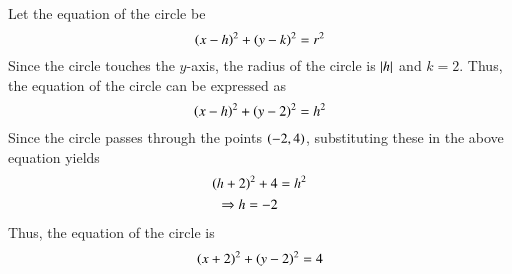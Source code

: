 Let the equation of the circle be
%
\begin{equation}
\left(x-h\right)^2 + \left(y-k\right)^2 = r^2
\end{equation}
%
Since the circle touches the $y$-axis, the radius of the circle is $\left\vert h\right\vert$ and $k = 2$.  Thus, the equation of the circle can be
expressed as
%
\begin{equation}
\left(x-h\right)^2 + \left(y-2\right)^2 = h^2
\end{equation}
%
Since the circle passes through the points  $\left(-2,4\right)$, substituting these in the above equation yields
%
\begin{align}
\left(h+2\right)^2 + 4 &= h^2 \\
\Rightarrow h = -2
\end{align}
%
Thus, the equation of the circle is
%
\begin{equation}
\left(x+2\right)^2 + \left(y-2\right)^2 = 4
\end{equation}
%
